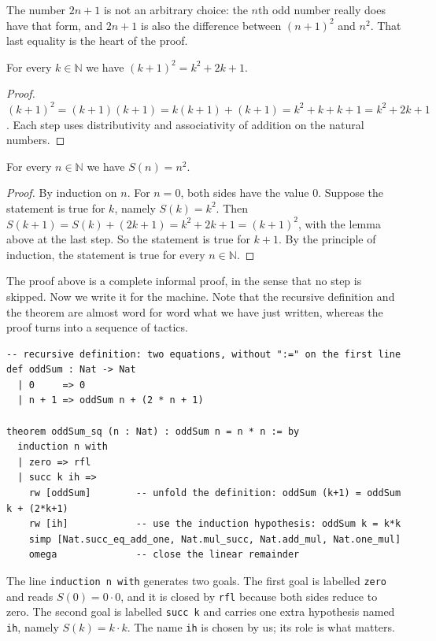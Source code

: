 The number $2n+1$ is not an arbitrary choice: the $n$th odd number really does have that form, and
$2n+1$ is also the difference between $(n+1)^{2}$ and $n^{2}$. That last equality is the heart of the
proof.

\begin{lemma}
For every $k\in\mathbb{N}$ we have $(k+1)^{2}=k^{2}+2k+1$.
\end{lemma}

\begin{proof}
$(k+1)^{2}=(k+1)(k+1)=k(k+1)+(k+1)=k^{2}+k+k+1=k^{2}+2k+1$. Each step uses distributivity and
associativity of addition on the natural numbers.
\end{proof}

\begin{teorema}
For every $n\in\mathbb{N}$ we have $S(n)=n^{2}$.
\end{teorema}

\begin{proof}
By induction on $n$. For $n=0$, both sides have the value $0$. Suppose the statement is true for
$k$, namely $S(k)=k^{2}$. Then $S(k+1)=S(k)+(2k+1)=k^{2}+2k+1=(k+1)^{2}$, with the lemma above at
the last step. So the statement is true for $k+1$. By the principle of induction, the statement is
true for every $n\in\mathbb{N}$.
\end{proof}

The proof above is a complete informal proof, in the sense that no step is skipped. Now we write it
for the machine. Note that the recursive definition and the theorem are almost word for word what we
have just written, whereas the proof turns into a sequence of tactics.

\begin{verbatim}
-- recursive definition: two equations, without ":=" on the first line
def oddSum : Nat -> Nat
  | 0     => 0
  | n + 1 => oddSum n + (2 * n + 1)

theorem oddSum_sq (n : Nat) : oddSum n = n * n := by
  induction n with
  | zero => rfl
  | succ k ih =>
    rw [oddSum]        -- unfold the definition: oddSum (k+1) = oddSum k + (2*k+1)
    rw [ih]            -- use the induction hypothesis: oddSum k = k*k
    simp [Nat.succ_eq_add_one, Nat.mul_succ, Nat.add_mul, Nat.one_mul]
    omega              -- close the linear remainder
\end{verbatim}

The line \texttt{induction n with} generates two goals. The first goal is labelled \texttt{zero} and
reads $S(0)=0\cdot 0$, and it is closed by \texttt{rfl} because both sides reduce to zero. The
second goal is labelled \texttt{succ k} and carries one extra hypothesis named \texttt{ih}, namely
$S(k)=k\cdot k$. The name \texttt{ih} is chosen by us; its role is what matters.

